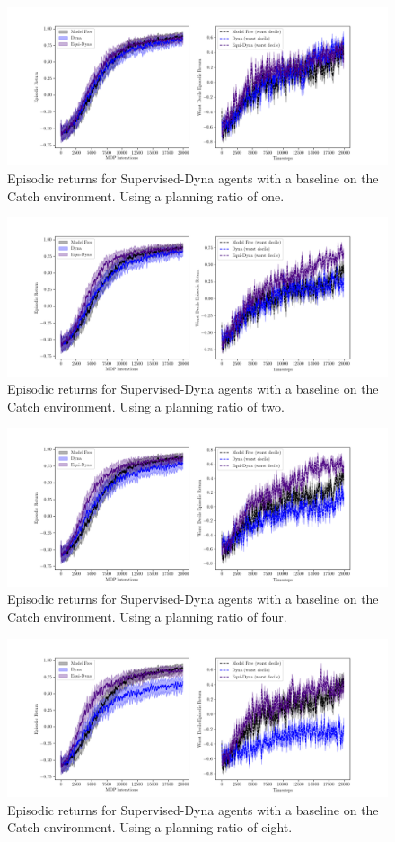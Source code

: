 \begin{figure}[h!]
	\centering
	\includegraphics[width=\textwidth]{Figures/Expert_Dyna_Catch_pr1.png}
	\caption{Episodic returns for Supervised-Dyna agents with a baseline on the Catch environment. Using a planning ratio of one.}
\end{figure}
\begin{figure}[h!]
	\centering
	\includegraphics[width=\textwidth]{Figures/Expert_Dyna_Catch_pr2.png}
	\caption{Episodic returns for Supervised-Dyna agents with a baseline on the Catch environment. Using a planning ratio of two.}
\end{figure}
\begin{figure}[h!]
	\centering
	\includegraphics[width=\textwidth]{Figures/Expert_Dyna_Catch_pr4.png}
	\caption{Episodic returns for Supervised-Dyna agents with a baseline on the Catch environment. Using a planning ratio of four.}
\end{figure}
\begin{figure}[h!]
	\centering
	\includegraphics[width=\textwidth]{Figures/Expert_Dyna_Catch_pr8.png}
	\caption{Episodic returns for Supervised-Dyna agents with a baseline on the Catch environment. Using a planning ratio of eight.}
\end{figure}
